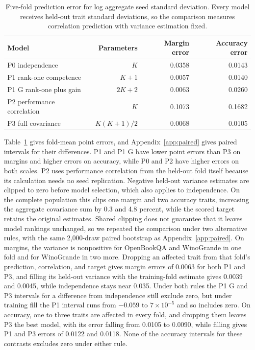 \begin{table}[!htb]
\centering
\caption{Five-fold prediction error for log aggregate seed standard deviation. Every model receives held-out trait standard deviations, so the comparison measures correlation prediction with variance estimation fixed.}
\label{tab:original11}
\small\setlength{\tabcolsep}{4pt}\renewcommand{\arraystretch}{1.12}
\begin{tabular}{lrrr}\toprule
Model & Parameters & Margin error & Accuracy error\\\midrule
P0 independence & $K$ & 0.0358 & 0.0143\\
P1 rank-one competence & $K+1$ & 0.0057 & 0.0140\\
P1 G rank-one plus gain & $2K+2$ & 0.0063 & 0.0260\\
P2 performance correlation & $K$ & 0.1073 & 0.1682\\
P3 full covariance & $K(K+1)/2$ & 0.0068 & 0.0105\\\bottomrule
\end{tabular}
\end{table}

Table~\ref{tab:original11} gives fold-mean point errors, and Appendix~\ref{app:paired} gives paired intervals for their differences. P1 and P1 G have lower point errors than P3 on margins and higher errors on accuracy, while P0 and P2 have higher errors on both scales. P2 uses performance correlation from the held-out fold itself because its calculation needs no seed replication. Negative held-out variance estimates are clipped to zero before model selection, which also applies to independence. On the complete population this clips one margin and two accuracy traits, increasing the aggregate covariance sum by 0.3 and 4.8 percent, while the scored target retains the original estimates. Shared clipping does not guarantee that it leaves model rankings unchanged, so we repeated the comparison under two alternative rules, with the same 2,000-draw paired bootstrap as Appendix~\ref{app:paired}. On margins, the variance is nonpositive for OpenBookQA and WinoGrande in one fold and for WinoGrande in two more. Dropping an affected trait from that fold's prediction, correlation, and target gives margin errors of 0.0063 for both P1 and P3, and filling its held-out variance with the training-fold estimate gives 0.0039 and 0.0045, while independence stays near 0.035. Under both rules the P1 G and P3 intervals for a difference from independence still exclude zero, but under training fill the P1 interval runs from $-0.059$ to $7\times10^{-5}$ and so includes zero. On accuracy, one to three traits are affected in every fold, and dropping them leaves P3 the best model, with its error falling from 0.0105 to 0.0090, while filling gives P1 and P3 errors of 0.0122 and 0.0118. None of the accuracy intervals for these contrasts excludes zero under either rule.

